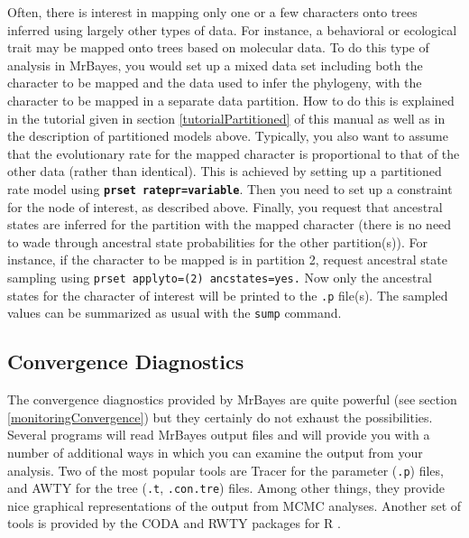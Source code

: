 \documentclass[12pt]{book}
\newcommand{\ttt}[1]{\texttt{#1}}
\newcommand{\tb}[1]{\ttt{\textbf{#1}}}
\begin{document}
Often, there is interest in mapping only one or a few characters onto trees inferred using largely
other types of data. For instance, a behavioral or ecological trait may be mapped onto trees based
on molecular data. To do this type of analysis in MrBayes, you would set up a mixed data set
including both the character to be mapped and the data used to infer the phylogeny, with the
character to be mapped in a separate data partition. How to do this is explained in the tutorial
given in section \ref{tutorialPartitioned} of this manual as well as in the description of
partitioned models above. Typically, you also want to assume that the evolutionary rate for the
mapped character is proportional to that of the other data (rather than identical). This is
achieved by setting up a partitioned rate model using \tb{prset ratepr=variable}. Then you need to
set up a constraint for the node of interest, as described above. Finally, you request that
ancestral states are inferred for the partition with the mapped character (there is no need to wade
through ancestral state probabilities for the other partition(s)). For instance, if the character
to be mapped is in partition 2, request ancestral state sampling using \ttt{prset applyto=(2)
ancstates=yes.} Now only the ancestral states for the character of interest will be printed to the
\ttt{.p} file(s). The sampled values can be summarized as usual with the \ttt{sump} command.

\subsection{Convergence Diagnostics}
The convergence diagnostics provided by MrBayes are quite powerful (see section
\ref{monitoringConvergence}) but they certainly do not exhaust the possibilities. Several programs
will read MrBayes output files and will provide you with a number of additional ways in which you
can examine the output from your analysis. Two of the most popular tools are Tracer
\citep{rambaut18} for the parameter (\ttt{.p}) files, and AWTY \citep{nylander07} for the tree
(\ttt{.t}, \ttt{.con.tre}) files. Among other things, they provide nice graphical representations
of the output from MCMC analyses. Another set of tools is provided by the CODA \citep{plummer06}
and RWTY \citep{warren17} packages for R \citep{rcoreteam18}.

\end{document}
